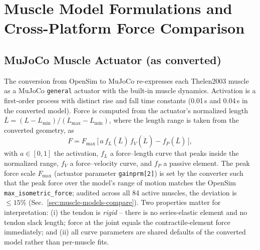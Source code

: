 
\section{Muscle Model Formulations and Cross-Platform Force Comparison}
\label{sec:muscle-models}

\subsection{MuJoCo Muscle Actuator (as converted)}

The conversion from OpenSim to MuJoCo re-expresses each Thelen2003
muscle as a MuJoCo \texttt{general} actuator with the built-in muscle
dynamics. Activation is a first-order process with distinct rise and
fall time constants (0.01\,s and 0.04\,s in the converted model). Force
is computed from the actuator's normalized length
$\bar{L} = (L - L_{\min}) / (L_{\max} - L_{\min})$, where the length
range is taken from the converted geometry, as
\begin{equation}
  F = F_{\max}\,\bigl[\,a\, f_L(\bar{L})\, f_V(\dot{L}) - f_P(\bar{L})\,\bigr],
  \label{eq:mj-muscle}
\end{equation}
with $a \in [0,1]$ the activation, $f_L$ a force--length curve that
peaks inside the normalized range, $f_V$ a force--velocity curve, and
$f_P$ a passive element. The peak force scale $F_{\max}$ (actuator
parameter \texttt{gainprm[2]}) is set by the converter such that the
peak force over the model's range of motion matches the OpenSim
\texttt{max\_isometric\_force}; audited across all 84 active muscles,
the deviation is $\le 15\%$ (Sec.~\ref{sec:muscle-models-compare}). Two
properties matter for interpretation: (i) the tendon is \emph{rigid} --
there is no series-elastic element and no tendon slack length; force at
the joint equals the contractile-element force immediately; and (ii)
all curve parameters are shared defaults of the converted model rather
than per-muscle fits.

